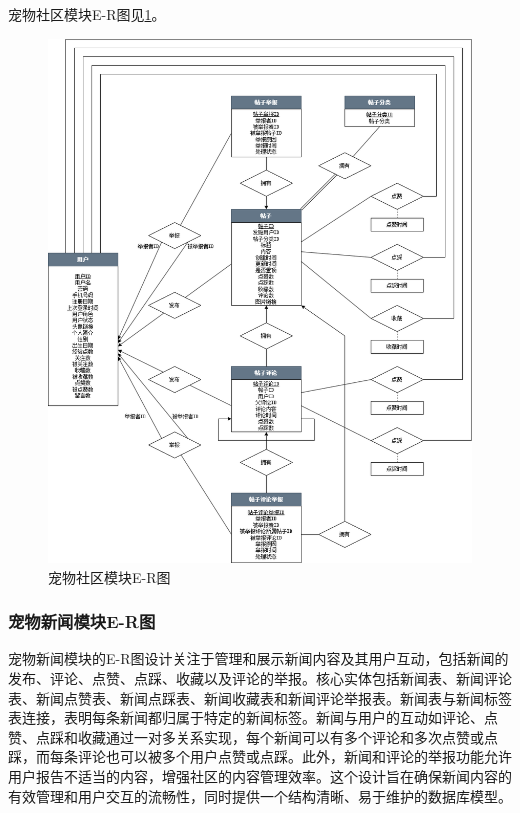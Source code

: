 宠物社区模块E-R图见\cref{fig:PetCommunityERDiagram}。

\begin{figure}[htbp]
    \centering
    \includegraphics[width=\textwidth]{figures/PetCommunityERDiagram.png}
    \caption{宠物社区模块E-R图}
    \label{fig:PetCommunityERDiagram}
\end{figure}

\subsubsection{宠物新闻模块E-R图}

宠物新闻模块的E-R图设计关注于管理和展示新闻内容及其用户互动，包括新闻的发布、评论、点赞、点踩、收藏以及评论的举报。核心实体包括新闻表、新闻评论表、新闻点赞表、新闻点踩表、新闻收藏表和新闻评论举报表。新闻表与新闻标签表连接，表明每条新闻都归属于特定的新闻标签。新闻与用户的互动如评论、点赞、点踩和收藏通过一对多关系实现，每个新闻可以有多个评论和多次点赞或点踩，而每条评论也可以被多个用户点赞或点踩。此外，新闻和评论的举报功能允许用户报告不适当的内容，增强社区的内容管理效率。这个设计旨在确保新闻内容的有效管理和用户交互的流畅性，同时提供一个结构清晰、易于维护的数据库模型。

